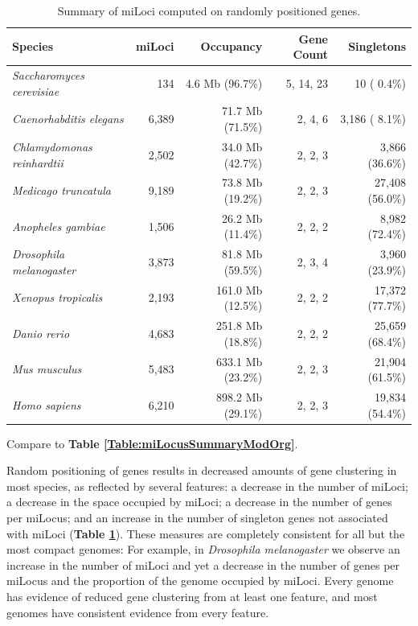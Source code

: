 \begin{table}[h]
\small
\caption{Summary of miLoci computed on randomly positioned genes.}
\label{Table:miLocusSummaryShuffled}
\begin{tabularx}{\textwidth}{lrrrr}
\hline
Species                                &               miLoci &            Occupancy &           Gene Count &           Singletons  \\ \hline
\textit{Saccharomyces cerevisiae}      &                  134 &      4.6 Mb (96.7\%) &            5, 14, 23 &          10 ( 0.4\%)  \\
\textit{Caenorhabditis elegans}        &                6,389 &     71.7 Mb (71.5\%) &              2, 4, 6 &       3,186 ( 8.1\%)  \\
\textit{Chlamydomonas reinhardtii}     &                2,502 &     34.0 Mb (42.7\%) &              2, 2, 3 &       3,866 (36.6\%)  \\
\textit{Medicago truncatula}           &                9,189 &     73.8 Mb (19.2\%) &              2, 2, 3 &      27,408 (56.0\%)  \\
\textit{Anopheles gambiae}             &                1,506 &     26.2 Mb (11.4\%) &              2, 2, 2 &       8,982 (72.4\%)  \\
\textit{Drosophila melanogaster}       &                3,873 &     81.8 Mb (59.5\%) &              2, 3, 4 &       3,960 (23.9\%)  \\
\textit{Xenopus tropicalis}            &                2,193 &    161.0 Mb (12.5\%) &              2, 2, 2 &      17,372 (77.7\%)  \\
\textit{Danio rerio}                   &                4,683 &    251.8 Mb (18.8\%) &              2, 2, 2 &      25,659 (68.4\%)  \\
\textit{Mus musculus}                  &                5,483 &    633.1 Mb (23.2\%) &              2, 2, 3 &      21,904 (61.5\%)  \\
\textit{Homo sapiens}                  &                6,210 &    898.2 Mb (29.1\%) &              2, 2, 3 &      19,834 (54.4\%)  \\ \hline
\end{tabularx}
\raggedright
{\scriptsize
Compare to \textbf{Table \ref{Table:miLocusSummaryModOrg}}.
}
\end{table}

Random positioning of genes results in decreased amounts of gene clustering in most species, as reflected by several features: a decrease in the number of miLoci; a decrease in the space occupied by miLoci; a decrease in the number of genes per miLocus; and an increase in the number of singleton genes not associated with miLoci (\textbf{Table \ref{Table:miLocusSummaryShuffled}}).
These measures are completely consistent for all but the most compact genomes:
For example, in \textit{Drosophila melanogaster} we observe an increase in the number of miLoci and yet a decrease in the number of genes per miLocus and the proportion of the genome occupied by miLoci.
Every genome has evidence of reduced gene clustering from at least one feature, and most genomes have consistent evidence from every feature.

